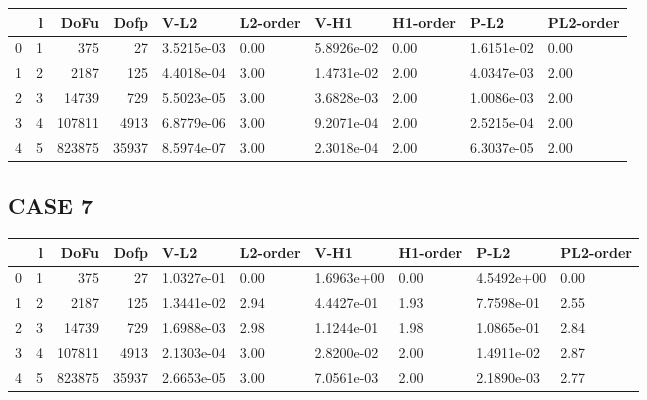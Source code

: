 \documentclass[11pt]{article}
\numberwithin{equation}{section}    %
\begin{document}
\begin{tabular}{lrrrllllll}
\hline
{} &  l &    DoFu &   Dofp &        V-L2 & L2-order &        V-H1 & H1-order &        P-L2 & PL2-order \\
\hline
0 &  1 &     375 &     27 &  3.5215e-03 &     0.00 &  5.8926e-02 &     0.00 &  1.6151e-02 &      0.00 \\
1 &  2 &    2187 &    125 &  4.4018e-04 &     3.00 &  1.4731e-02 &     2.00 &  4.0347e-03 &      2.00 \\
2 &  3 &   14739 &    729 &  5.5023e-05 &     3.00 &  3.6828e-03 &     2.00 &  1.0086e-03 &      2.00 \\
3 &  4 &  107811 &   4913 &  6.8779e-06 &     3.00 &  9.2071e-04 &     2.00 &  2.5215e-04 &      2.00 \\
4 &  5 &  823875 &  35937 &  8.5974e-07 &     3.00 &  2.3018e-04 &     2.00 &  6.3037e-05 &      2.00 \\
\hline
\end{tabular}


\subsection*{CASE 7}

\begin{tabular}{lrrrllllll}
\hline
{} &  l &    DoFu &   Dofp &        V-L2 & L2-order &        V-H1 & H1-order &        P-L2 & PL2-order \\
\hline
0 &  1 &     375 &     27 &  1.0327e-01 &     0.00 &  1.6963e+00 &     0.00 &  4.5492e+00 &      0.00 \\
1 &  2 &    2187 &    125 &  1.3441e-02 &     2.94 &  4.4427e-01 &     1.93 &  7.7598e-01 &      2.55 \\
2 &  3 &   14739 &    729 &  1.6988e-03 &     2.98 &  1.1244e-01 &     1.98 &  1.0865e-01 &      2.84 \\
3 &  4 &  107811 &   4913 &  2.1303e-04 &     3.00 &  2.8200e-02 &     2.00 &  1.4911e-02 &      2.87 \\
4 &  5 &  823875 &  35937 &  2.6653e-05 &     3.00 &  7.0561e-03 &     2.00 &  2.1890e-03 &      2.77 \\
\hline
\end{tabular}
\end{document}

